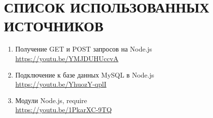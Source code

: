\newpage

\section*{СПИСОК ИСПОЛЬЗОВАННЫХ ИСТОЧНИКОВ}

\begin{enumerate}
    \item Получение GET и POST запросов на Node.js \\
    \url{https://youtu.be/YMJDUHUccvA}

    \item Подключение к базе данных MySQL в Node.js \\
    \url{https://youtu.be/YhuozY-qplI}

    \item Модули Node.js, require \\
    \url{https://youtu.be/1PkarXC-9TQ}
\end{enumerate}
